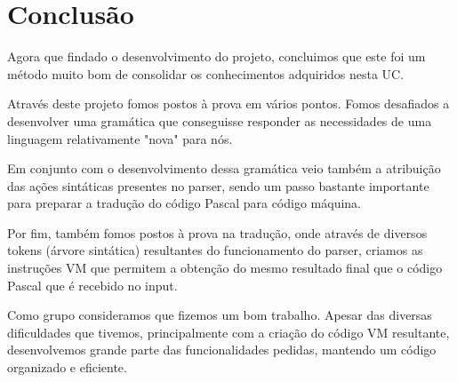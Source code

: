 \chapter{Conclusão}

Agora que findado o desenvolvimento do projeto, concluimos que este foi um método muito bom de consolidar os conhecimentos adquiridos nesta UC. 
\par
Através deste projeto fomos postos à prova em vários pontos. Fomos desafiados a desenvolver uma gramática que conseguisse responder as necessidades de uma linguagem relativamente "nova" para nós.
\par
Em conjunto com o desenvolvimento dessa gramática veio também a atribuição das ações sintáticas presentes no parser, sendo um passo bastante importante para preparar a tradução do código Pascal para código máquina.
\par
Por fim, também fomos postos à prova na tradução, onde através de diversos tokens (árvore sintática) resultantes do funcionamento do parser, criamos as instruções VM que permitem a obtenção do mesmo resultado final que o código Pascal que é recebido no input.
\par
Como grupo consideramos que fizemos um bom trabalho. Apesar das diversas dificuldades que tivemos, principalmente com a criação do código VM resultante, desenvolvemos grande parte das funcionalidades pedidas, mantendo um código organizado e eficiente.
